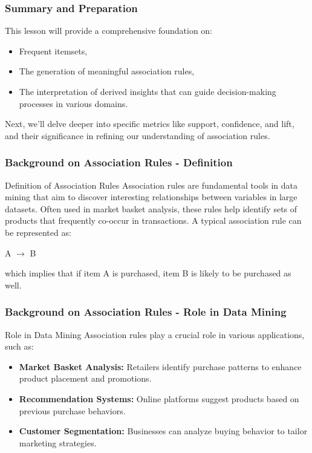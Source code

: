 \documentclass[aspectratio=169]{beamer}
\begin{document}
\begin{frame}[fragile]
    \frametitle{Summary and Preparation}
    This lesson will provide a comprehensive foundation on:
    \begin{itemize}
        \item Frequent itemsets,
        \item The generation of meaningful association rules,
        \item The interpretation of derived insights that can guide decision-making processes in various domains.
    \end{itemize}
    \vfill
    Next, we'll delve deeper into specific metrics like support, confidence, and lift, and their significance in refining our understanding of association rules.
\end{frame}

\begin{frame}[fragile]
    \frametitle{Background on Association Rules - Definition}
    \begin{block}{Definition of Association Rules}
        Association rules are fundamental tools in data mining that aim to discover interesting relationships between variables in large datasets. 
        Often used in market basket analysis, these rules help identify sets of products that frequently co-occur in transactions.
        A typical association rule can be represented as:
        \begin{center}
            A $\rightarrow$ B
        \end{center}
        which implies that if item A is purchased, item B is likely to be purchased as well.
    \end{block}
\end{frame}

\begin{frame}[fragile]
    \frametitle{Background on Association Rules - Role in Data Mining}
    \begin{block}{Role in Data Mining}
        Association rules play a crucial role in various applications, such as:
        \begin{itemize}
            \item \textbf{Market Basket Analysis:} Retailers identify purchase patterns to enhance product placement and promotions.
            \item \textbf{Recommendation Systems:} Online platforms suggest products based on previous purchase behaviors.
            \item \textbf{Customer Segmentation:} Businesses can analyze buying behavior to tailor marketing strategies.
        \end{itemize}
    \end{block}
\end{frame}
\end{document}
